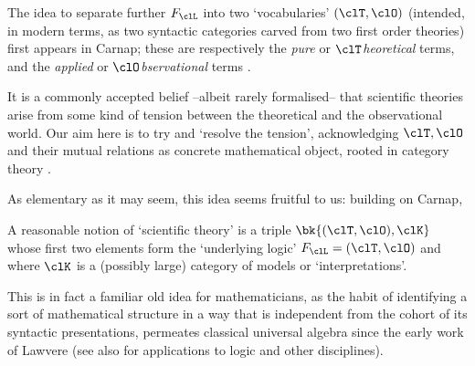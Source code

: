 The idea to separate further $F_\clL$ into two `vocabularies' $(\clT,\clO)$ (intended, in modern terms, as two syntactic categories carved from two first order theories) first appears in Carnap; these are respectively the \emph{pure} or $\clT$\emph{heoretical} terms, and the \emph{applied} or $\clO$\emph{bservational} terms \cite{carnap56}.

It is a commonly accepted belief --albeit rarely formalised-- that scientific theories arise from some kind of tension between the theoretical and the observational world. Our aim here is to try and `resolve the tension', acknowledging $\clT,\clO$ and their mutual relations as concrete mathematical object, rooted in category theory \cite{McL,pedicchiofoundations,riehlcontext,leinster2014basic}.

As elementary as it may seem, this idea seems fruitful to us: building on Carnap,
\begin{remark*}
	A reasonable notion of `scientific theory' is a triple $\bk{(\clT,\clO), \clK}$ whose first two elements form the `underlying logic' $F_\clL=(\clT,\clO)$ and where $\clK$ is a (possibly large) category of models or `interpretations'.
\end{remark*}
This is in fact a familiar old idea for mathematicians, as the habit of identifying a sort of mathematical structure in a way that is independent from the cohort of its syntactic presentations, permeates classical universal algebra since the early work of Lawvere \cite{lawvere1963functorial,lawvere1996unity} (see also \cite{abramskyno,Borceux1994,makkai1989accessible} for applications to logic and other disciplines).

